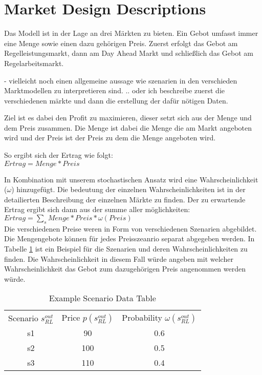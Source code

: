 


\section{Market Design Descriptions}
Das Modell ist in der Lage an drei Märkten zu bieten. Ein Gebot umfasst immer eine Menge sowie einen dazu gehörigen Preis. Zuerst erfolgt
das Gebot am Regelleistungsmarkt, dann am Day Ahead Markt und schließlich das Gebot am Regelarbeitsmarkt.

- vielleicht noch einen allgemeine aussage wie szenarien in den verschieden Marktmodellen zu interpretieren sind.
.. oder ich beschreibe zuerst die verschiedenen märkte und dann die erstellung der dafür nötigen Daten.


Ziel ist es dabei den Profit zu maximieren, dieser setzt sich aus der Menge und dem Preis zusammen.
Die Menge ist dabei die Menge die am Markt angeboten wird und der Preis ist der Preis zu dem die Menge angeboten wird.

So ergibt sich der Ertrag wie folgt:\\

$Ertrag = Menge * Preis$

In Kombination mit unserem stochastischen Ansatz wird eine Wahrscheinlichkeit ($\omega$) hinzugefügt. Die
bedeutung der einzelnen Wahrscheinlichkeiten ist in der detailierten Beschreibung der einzelnen Märkte zu finden.
Der zu erwartende Ertrag ergibt sich dann aus der summe aller möglichkeiten:\\
$Ertrag = \sum_s Menge * Preis * \omega(Preis)$\\

Die verschiedenen Preise weren in Form von verschiedenen Szenarien abgebildet. Die Mengengebote können
für jedes Preisszeanrio separat abgegeben werden. In Tabelle \ref{tab:example_scenario} ist ein Beispiel für die
Szenarien und deren Wahrscheinlichkeiten zu finden. Die Wahrscheinlichkeit in diesem Fall würde angeben mit welcher
Wahrscheinlichkeit das Gebot zum dazugehörigen Preis angenommen werden würde.\\

\begin{table}[H]
	\begin{tabular}{c|c|c}
		Scenario $s^{out}_{RL}$ & Price $p(s^{out}_{RL})$ & Probability $\omega(s^{out}_{RL})$ \\
		s1                      & 90                      & 0.6                                \\
		s2                      & 100                     & 0.5                                \\
		s3                      & 110                     & 0.4                                \\
	\end{tabular}\\
	\label{tab:example_scenario}
	\caption{Example Scenario Data Table}
\end{table}

